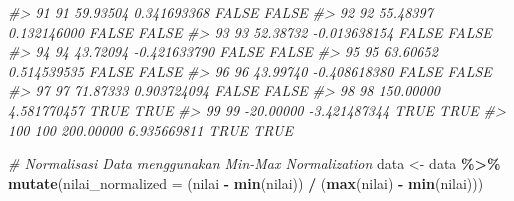 \documentclass[
  oneside]{book}
\newenvironment{Shaded}{\begin{snugshade}}{\end{snugshade}}
\newcommand{\AttributeTok}[1]{\textcolor[rgb]{0.13,0.29,0.53}{#1}}
\newcommand{\CommentTok}[1]{\textcolor[rgb]{0.56,0.35,0.01}{\textit{#1}}}
\newcommand{\FunctionTok}[1]{\textcolor[rgb]{0.13,0.29,0.53}{\textbf{#1}}}
\newcommand{\NormalTok}[1]{#1}
\newcommand{\OtherTok}[1]{\textcolor[rgb]{0.56,0.35,0.01}{#1}}
\newcommand{\SpecialCharTok}[1]{\textcolor[rgb]{0.81,0.36,0.00}{\textbf{#1}}}
\begin{document}
\begin{Shaded}
\begin{Highlighting}[]
\CommentTok{\#\textgreater{} 91   91  59.93504  0.341693368     FALSE       FALSE}
\CommentTok{\#\textgreater{} 92   92  55.48397  0.132146000     FALSE       FALSE}
\CommentTok{\#\textgreater{} 93   93  52.38732 {-}0.013638154     FALSE       FALSE}
\CommentTok{\#\textgreater{} 94   94  43.72094 {-}0.421633790     FALSE       FALSE}
\CommentTok{\#\textgreater{} 95   95  63.60652  0.514539535     FALSE       FALSE}
\CommentTok{\#\textgreater{} 96   96  43.99740 {-}0.408618380     FALSE       FALSE}
\CommentTok{\#\textgreater{} 97   97  71.87333  0.903724094     FALSE       FALSE}
\CommentTok{\#\textgreater{} 98   98 150.00000  4.581770457      TRUE        TRUE}
\CommentTok{\#\textgreater{} 99   99 {-}20.00000 {-}3.421487344      TRUE        TRUE}
\CommentTok{\#\textgreater{} 100 100 200.00000  6.935669811      TRUE        TRUE}
\end{Highlighting}
\end{Shaded}

\begin{Shaded}
\begin{Highlighting}[]
\CommentTok{\# Normalisasi Data menggunakan Min{-}Max Normalization}
\NormalTok{data }\OtherTok{\textless{}{-}}\NormalTok{ data }\SpecialCharTok{\%\textgreater{}\%}
  \FunctionTok{mutate}\NormalTok{(}\AttributeTok{nilai\_normalized =}\NormalTok{ (nilai }\SpecialCharTok{{-}} \FunctionTok{min}\NormalTok{(nilai)) }\SpecialCharTok{/}\NormalTok{ (}\FunctionTok{max}\NormalTok{(nilai) }\SpecialCharTok{{-}} \FunctionTok{min}\NormalTok{(nilai)))}
\end{Highlighting}
\end{Shaded}
\end{document}
